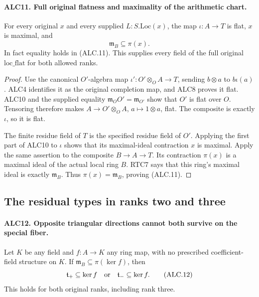 \paragraph{ALC11. Full original flatness and maximality of the arithmetic chart.}
\label{claim:ALC11}
For every original \(x\) and every supplied
\(L:S.\mathrm{Loc}(x)\), the map \(\iota:A\to T\) is
flat, \(x\) is maximal, and
\[
                    \mathfrak m_B\subseteq\pi(x).
                                                        \tag{ALC.11}
\]
In fact equality holds in (ALC.11).  This supplies every
field of the full original \(\mathrm{loc\_flat}\) for
both allowed ranks.

\begin{proof}
Use the canonical \(O'\)-algebra map
\(\iota':O'\otimes_OA\to T\), sending
\(b\otimes a\) to \(b\iota(a)\).  ALC4 identifies it
as the original completion map, and ALC8 proves it flat.
ALC10 and the supplied equality
\(\mathfrak m_OO'=\mathfrak m_{O'}\) show that \(O'\)
is flat over \(O\).  Tensoring therefore makes
\(A\to O'\otimes_OA\), \(a\mapsto1\otimes a\),
flat.  The composite is exactly \(\iota\), so it is flat.

The finite residue field of \(T\) is the specified residue
field of \(O'\).  Applying the first part of ALC10 to
\(\iota\) shows that its maximal-ideal contraction \(x\)
is maximal.  Apply the same assertion to the composite
\(B\to A\to T\).  Its contraction \(\pi(x)\) is a
maximal ideal of the actual local ring \(B\).  RTC7 says
that this ring's maximal ideal is exactly \(\mathfrak m_B\).
Thus \(\pi(x)=\mathfrak m_B\), proving (ALC.11).
\end{proof}

\subsection{The residual types in ranks two and three}

\paragraph{ALC12. Opposite triangular directions cannot both survive on the special fiber.}
\label{claim:ALC12}
Let \(K\) be any field and \(f:A\to K\) any ring map,
with no prescribed coefficient-field structure on \(K\).
If \(\mathfrak m_B\subseteq\pi(\ker f)\), then
\[
             \mathfrak t_+\subseteq\ker f
             \quad\hbox{or}\quad
             \mathfrak t_-\subseteq\ker f.
                                                        \tag{ALC.12}
\]
This holds for both original ranks, including rank three.

